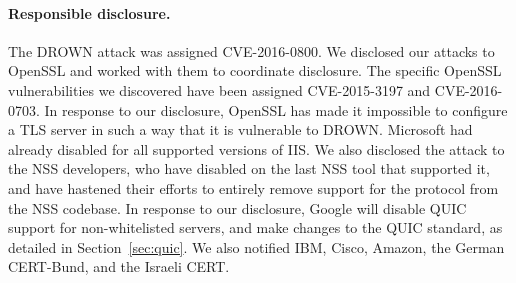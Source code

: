 \paragraph{Responsible disclosure.}
The DROWN attack was assigned CVE-2016-0800.
We disclosed our attacks to OpenSSL and worked with them to coordinate disclosure.  The specific OpenSSL vulnerabilities we discovered have been assigned CVE-2015-3197 and CVE-2016-0703.  In response to our disclosure, OpenSSL has
made it impossible to configure a TLS server in such a way that it is
vulnerable to DROWN\@.
Microsoft  had already disabled \ssltwo for all supported versions of IIS\@.
We also disclosed the attack to the NSS developers, who have disabled \ssltwo on the last NSS tool that supported it, and have hastened their efforts to entirely remove support for the protocol from the NSS codebase.
In response to our disclosure, Google will disable QUIC support for non-whitelisted servers, and make changes to the QUIC standard, as detailed in Section~\ref{sec:quic}.
We also notified IBM, Cisco, Amazon, the German CERT-Bund, and the Israeli CERT\@.

